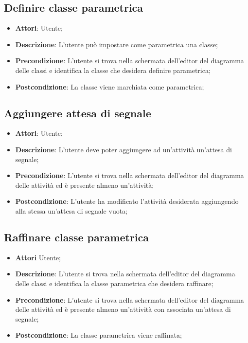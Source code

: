 \documentclass[../AnalisiDeiRequisiti.tex]{subfiles}
\begin{document}
			\subsection{Definire classe parametrica}
			\begin{itemize}
				\item \textbf{Attori}: Utente;
				\item \textbf{Descrizione}: L'utente può impostare come parametrica una classe;
				\item \textbf{Precondizione}: L’utente si trova nella schermata dell'editor del diagramma delle classi e identifica la classe che desidera definire parametrica;
				\item \textbf{Postcondizione}: La classe viene marchiata come parametrica;
			\end{itemize}
			
			\subsection{Aggiungere attesa di segnale}
			\begin{itemize}
				\item \textbf{Attori}: Utente;
				\item \textbf{Descrizione}: L'utente deve poter aggiungere ad un'attività un'attesa di segnale;
				\item \textbf{Precondizione}: L'utente si trova nella schermata dell'editor del diagramma delle attività ed è presente almeno un'attività;
				\item \textbf{Postcondizione}: L'utente ha modificato l'attività desiderata aggiungendo alla stessa un'attesa di segnale vuota;
			\end{itemize}
			
			\subsection{Raffinare classe parametrica}
			\begin{itemize}
				\item \textbf{Attori} Utente;
				\item \textbf{Descrizione}: L'utente si trova nella schermata dell'editor del diagramma delle classi e identifica la classe parametrica che desidera raffinare;
				\item \textbf{Precondizione}: L'utente si trova nella schermata dell'editor del diagramma delle attività ed è presente almeno un'attività con associata un'attesa di segnale;
				\item \textbf{Postcondizione}: La classe parametrica viene raffinata;
			\end{itemize}
		
\end{document}

